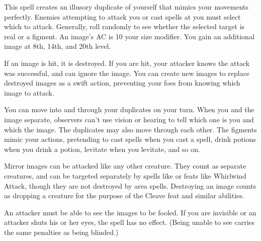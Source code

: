 \begin{spelleffect}
  This spell creates an illusory duplicate of yourself that mimics your movements perfectly. Enemies attempting to attack you or cast spells at you must select which to attack. Generally, roll randomly to see whether the selected target is real or a figment. An image's AC is 10 \add your size modifier. You gain an additional image at 8th, 14th, and 20th level. 
  \par If an image is hit, it is destroyed. If you are hit, your attacker knows the attack was successful, and can ignore the image. You can create new images to replace destroyed images as a swift action, preventing your foes from knowing which image to attack.
  \par You can move into and through your duplicates on your turn. When you and the image separate, observers can't use vision or hearing to tell which one is you and which the image. The duplicates may also move through each other. The figments mimic your actions, pretending to cast spells when you cast a spell, drink potions when you drink a potion, levitate when you levitate, and so on.
  \par Mirror images can be attacked like any other creature. They count as separate creatures, and can be targeted separately by spells like  or feats like Whirlwind Attack, though they are not destroyed by area spells. Destroying an image counts as dropping a creature for the purpose of the Cleave feat and similar abilities.
\end{spelleffect}
\begin{spellnotes}
  An attacker must be able to see the images to be fooled. If you are invisible or an attacker shuts his or her eyes, the spell has no effect. (Being unable to see carries the same penalties as being blinded.)
\end{spellnotes}

